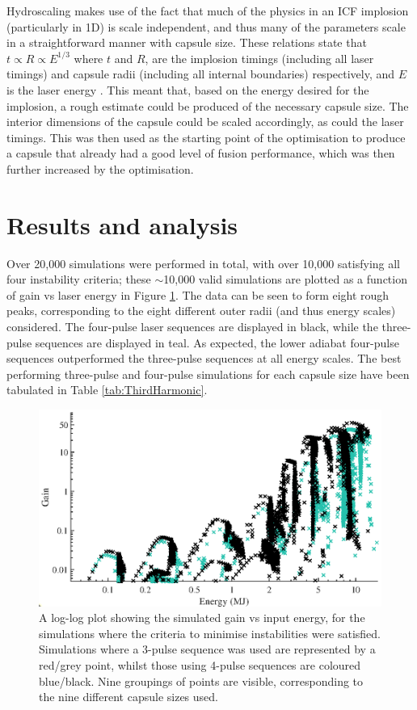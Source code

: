 Hydroscaling makes use of the fact that much of the physics in an ICF implosion (particularly in 1D) is scale independent, and thus many of the parameters scale in a straightforward manner with capsule size. These relations state that $t \propto R \propto E^{1/3}$ where $t$ and $R$, are the implosion timings (including all laser timings) and capsule radii (including all internal boundaries) respectively, and $E$ is the laser energy \cite{Nora2014}. This meant that, based on the energy desired for the implosion, a rough estimate could be produced of the necessary capsule size. The interior dimensions of the capsule could be scaled accordingly, as could the laser timings. This was then used as the starting point of the optimisation to produce a capsule that already had a good level of fusion performance, which was then further increased by the optimisation.

\section{Results and analysis} \label{sec: LowCRResults}

Over 20,000 simulations were performed in total, with over 10,000 satisfying all four instability criteria; these $\sim$10,000 valid simulations are plotted as a function of gain vs laser energy in Figure \ref{fig:loglog}. The data can be seen to form eight rough peaks, corresponding to the eight different outer radii (and thus energy scales) considered. The four-pulse laser sequences are displayed in black, while the three-pulse sequences are displayed in teal. As expected, the lower adiabat four-pulse sequences outperformed the three-pulse sequences at all energy scales. The best performing three-pulse and four-pulse simulations for each capsule size have been tabulated in Table \ref{tab:ThirdHarmonic}. 

\begin{figure}[ht!]
\centering
\includegraphics{figures/LowCR/AllData_full.eps}
\caption{A log-log plot showing the simulated gain vs input energy, for the simulations where the criteria to minimise instabilities were satisfied. Simulations where a 3-pulse sequence was used are represented by a red/grey point, whilst those using 4-pulse sequences are coloured blue/black. Nine groupings of points are visible, corresponding to the nine different capsule sizes used.}
\label{fig:loglog}
\end{figure}


